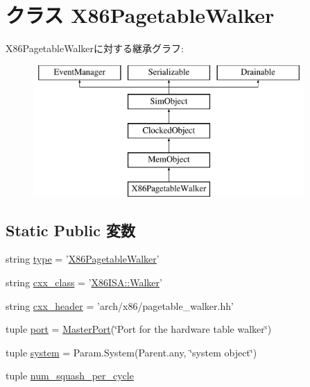 \hypertarget{classX86TLB_1_1X86PagetableWalker}{
\section{クラス X86PagetableWalker}
\label{classX86TLB_1_1X86PagetableWalker}
}
X86PagetableWalkerに対する継承グラフ:\begin{figure}[H]
\begin{center}
\leavevmode
\includegraphics[height=5cm]{classX86TLB_1_1X86PagetableWalker}
\end{center}
\end{figure}
\subsection*{Static Public 変数}
\begin{DoxyCompactItemize}
\item 
string \hyperlink{classX86TLB_1_1X86PagetableWalker_acce15679d830831b0bbe8ebc2a60b2ca}{type} = '\hyperlink{classX86TLB_1_1X86PagetableWalker}{X86PagetableWalker}'
\item 
string \hyperlink{classX86TLB_1_1X86PagetableWalker_a58cd55cd4023648e138237cfc0822ae3}{cxx\_\-class} = '\hyperlink{classX86ISA_1_1Walker}{X86ISA::Walker}'
\item 
string \hyperlink{classX86TLB_1_1X86PagetableWalker_a17da7064bc5c518791f0c891eff05fda}{cxx\_\-header} = 'arch/x86/pagetable\_\-walker.hh'
\item 
tuple \hyperlink{classX86TLB_1_1X86PagetableWalker_a1aadf525515ecfcf662c2aa51a503763}{port} = \hyperlink{classm5_1_1params_1_1MasterPort}{MasterPort}(\char`\"{}Port for the hardware table walker\char`\"{})
\item 
tuple \hyperlink{classX86TLB_1_1X86PagetableWalker_ab737471139f5a296e5b26e8a0e1b0744}{system} = Param.System(Parent.any, \char`\"{}system object\char`\"{})
\item 
tuple \hyperlink{classX86TLB_1_1X86PagetableWalker_a6fedb4107249699f51b624cf7677475c}{num\_\-squash\_\-per\_\-cycle}
\end{DoxyCompactItemize}


